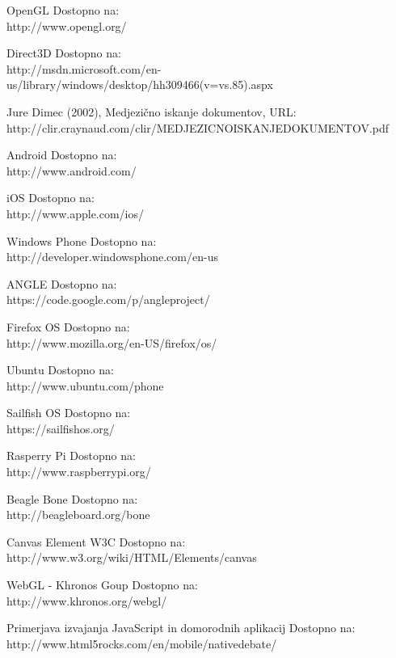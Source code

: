 \begin{thebibliography}{1}


 OpenGL
Dostopno na:\\ http://www.opengl.org/

 Direct3D
Dostopno na:\\ http://msdn.microsoft.com/en-us/library/windows/desktop/hh309466(v=vs.85).aspx

 Jure Dimec (2002), Medjezično iskanje dokumentov, URL: http://clir.craynaud.com/clir/MEDJEZICNOISKANJEDOKUMENTOV.pdf

 Android
Dostopno na:\\ http://www.android.com/

 iOS
Dostopno na:\\ http://www.apple.com/ios/

 Windows Phone
Dostopno na:\\ http://developer.windowsphone.com/en-us

 ANGLE
Dostopno na:\\ https://code.google.com/p/angleproject/

 Firefox OS
Dostopno na:\\ http://www.mozilla.org/en-US/firefox/os/

 Ubuntu
Dostopno na:\\ http://www.ubuntu.com/phone

 Sailfish OS
Dostopno na:\\ https://sailfishos.org/

 Rasperry Pi 
Dostopno na:\\ http://www.raspberrypi.org/

 Beagle Bone
Dostopno na:\\ http://beagleboard.org/bone

 Canvas Element W3C 
Dostopno na:\\ http://www.w3.org/wiki/HTML/Elements/canvas

 WebGL - Khronos Goup 
Dostopno na:\\ http://www.khronos.org/webgl/

 Primerjava izvajanja JavaScript in domorodnih aplikacij
Dostopno na:\\ http://www.html5rocks.com/en/mobile/nativedebate/


\end{thebibliography}
